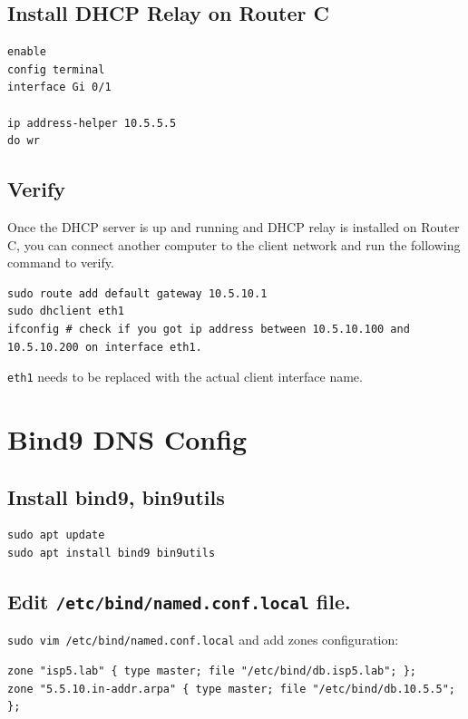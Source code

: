 \documentclass[11pt]{article}
\begin{document}
\subsection{Install DHCP Relay on Router C}
\label{sec:orgbad5548}

\begin{verbatim}
enable
config terminal
interface Gi 0/1

ip address-helper 10.5.5.5
do wr
\end{verbatim}

\subsection{Verify}
\label{sec:orgb0c491a}

Once the DHCP server is up and running and DHCP relay is installed on Router C,
you can connect another computer to the client network and run the following command to verify.

\begin{verbatim}
sudo route add default gateway 10.5.10.1
sudo dhclient eth1
ifconfig # check if you got ip address between 10.5.10.100 and 10.5.10.200 on interface eth1.
\end{verbatim}

\texttt{eth1} needs to be replaced with the actual client interface name.


\section{Bind9 DNS Config}
\label{sec:orga01fd8a}

\subsection{Install bind9, bin9utils}
\label{sec:orgfa0d93c}

\begin{verbatim}
sudo apt update
sudo apt install bind9 bin9utils
\end{verbatim}

\subsection{Edit \texttt{/etc/bind/named.conf.local} file.}
\label{sec:org3dbb4ed}

\texttt{sudo vim /etc/bind/named.conf.local} and add zones configuration:

\begin{verbatim}
zone "isp5.lab" { type master; file "/etc/bind/db.isp5.lab"; };
zone "5.5.10.in-addr.arpa" { type master; file "/etc/bind/db.10.5.5"; };
\end{verbatim}
\end{document}
